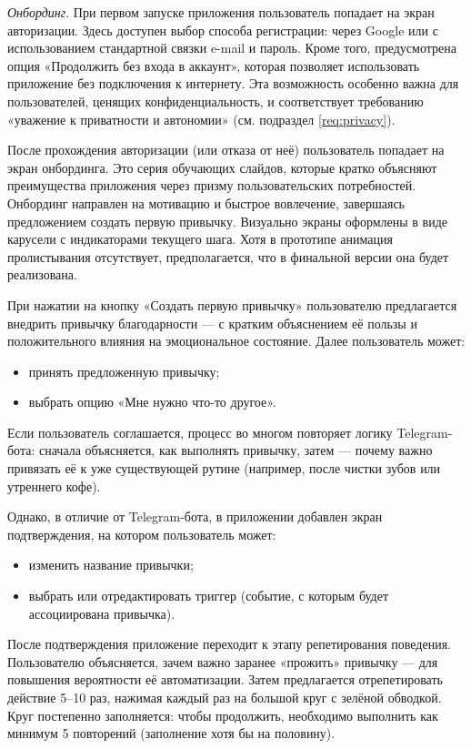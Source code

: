\documentclass[pdflatex,sn-mathphys-num]{sn-jnl}%
\theoremstyle{thmstyleone}%
\theoremstyle{thmstyletwo}%
\theoremstyle{thmstylethree}%
\begin{document}
\textit{Онбординг}. При первом запуске приложения пользователь попадает на экран авторизации. Здесь доступен выбор способа регистрации: через Google или с использованием стандартной связки e-mail и пароль. Кроме того, предусмотрена опция «Продолжить без входа в аккаунт», которая позволяет использовать приложение без подключения к интернету. Эта возможность особенно важна для пользователей, ценящих конфиденциальность, и соответствует требованию «уважение к приватности и автономии» (см. подраздел \ref{req:privacy}).

После прохождения авторизации (или отказа от неё) пользователь попадает на экран онбординга. Это серия обучающих слайдов, которые кратко объясняют преимущества приложения через призму пользовательских потребностей. Онбординг направлен на мотивацию и быстрое вовлечение, завершаясь предложением создать первую привычку. Визуально экраны оформлены в виде карусели с индикаторами текущего шага. Хотя в прототипе анимация пролистывания отсутствует, предполагается, что в финальной версии она будет реализована.

При нажатии на кнопку «Создать первую привычку» пользователю предлагается внедрить привычку благодарности — с кратким объяснением её пользы и положительного влияния на эмоциональное состояние. Далее пользователь может:

\begin{itemize}
\item принять предложенную привычку;
\item выбрать опцию «Мне нужно что-то другое».
\end{itemize}

Если пользователь соглашается, процесс во многом повторяет логику Telegram-бота: сначала объясняется, как выполнять привычку, затем — почему важно привязать её к уже существующей рутине (например, после чистки зубов или утреннего кофе).

Однако, в отличие от Telegram-бота, в приложении добавлен экран подтверждения, на котором пользователь может:

\begin{itemize}
\item изменить название привычки;
\item выбрать или отредактировать триггер (событие, с которым будет ассоциирована привычка).
\end{itemize}

После подтверждения приложение переходит к этапу репетирования поведения. Пользователю объясняется, зачем важно заранее «прожить» привычку — для повышения вероятности её автоматизации. Затем предлагается отрепетировать действие 5–10 раз, нажимая каждый раз на большой круг с зелёной обводкой. Круг постепенно заполняется: чтобы продолжить, необходимо выполнить как минимум 5 повторений (заполнение хотя бы на половину).
\end{document}
